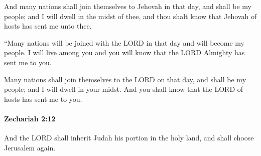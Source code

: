 			\begin{versebox}
					\item[BHS] 
					\item[LXX] 
					\item[ASV] And many nations shall join themselves to Jehovah in that day, and shall be my people; and I will dwell in the midst of thee, and thou shalt know that Jehovah of hosts has sent me unto thee.
					\item[NIV] “Many nations will be joined with the LORD in that day and will become my people. I will live among you and you will know that the LORD Almighty has sent me to you.
					\item[NRSV] Many nations shall join themselves to the LORD on that day, and shall be my people; and I will dwell in your midst. And you shall know that the LORD of hosts has sent me to you.
			\end{versebox}

		\paragraph{Zechariah 2:12} %
			\label{ZECHARIAH-2-12}

			And the LORD shall inherit Judah his portion in the holy land, and shall choose Jerusalem again.

